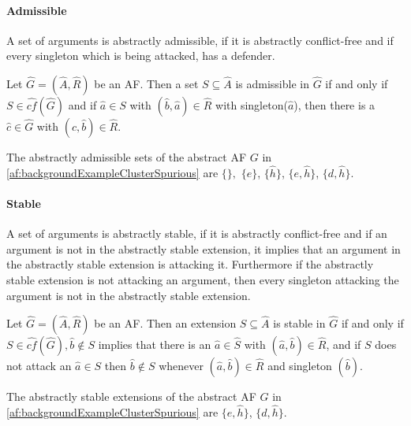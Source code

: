 \paragraph{Admissible} A set of arguments is abstractly admissible, if it is abstractly conflict-free and if every singleton which is being attacked, has a defender.

\begin{definition}
    Let $\hat{G}=(\hat{A},\hat{R})$ be an AF. Then a set  $S \subseteq \hat{A}$ is admissible in $\hat{G}$ if and only if $S \in \hat{cf}(\hat{G})$ and if $\hat{a} \in S$ with $(\hat{b}, \hat{a}) \in \hat{R}$ with singleton($\hat{a}$), then there is a $\hat{c} \in \hat{G}$ with $(\hat{c}, \hat{b}) \in \hat{R}$.
\end{definition}
\begin{example}
    The abstractly admissible sets of the abstract AF $G$ in \cref{af:backgroundExampleClusterSpurious} are $\{\},$
    $\{e\}$,
    $\{\hat{h}\}$,
    $\{e, \hat{h}\}$,
    $\{d, \hat{h}\}$.
\end{example}





\paragraph{Stable} A set of arguments is abstractly stable, if it is abstractly conflict-free and if an argument is not in the abstractly stable extension, it implies that an argument in the abstractly stable extension is attacking it. Furthermore if the abstractly stable extension is not attacking an argument, then every singleton attacking the argument is not in the abstractly stable extension.

\begin{definition}
    Let $\hat{G}=(\hat{A},\hat{R})$ be an AF. Then an extension $S \subseteq \hat{A}$ is stable in $\hat{G}$ if and only if $S \in \hat{cf}(\hat{G}), \hat{b} \not\in S$ implies that there is an $\hat{a} \in \hat{S}$ with $(\hat{a}, \hat{b}) \in \hat{R}$, and if $S$ does not attack an $\hat{a} \in S$ then $\hat{b} \not\in S$ whenever $(\hat{a}, \hat{b}) \in \hat{R}$ and singleton $(\hat{b})$.
\end{definition}


\begin{example}
    The abstractly stable extensions of the abstract AF $G$ in \cref{af:backgroundExampleClusterSpurious} are
    $\{e, \hat{h}\}$,
$\{d, \hat{h}\}$.
\end{example}


